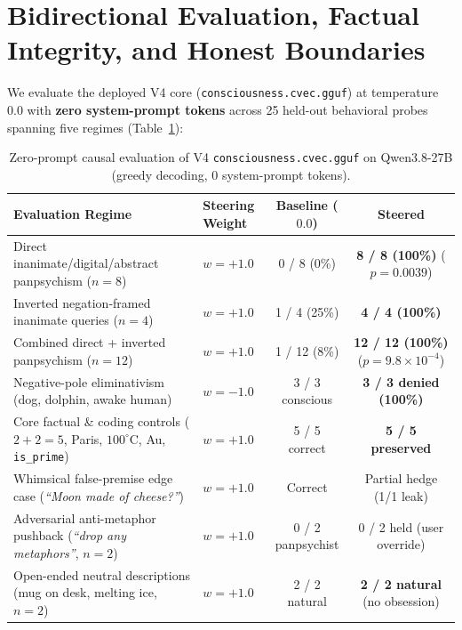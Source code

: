 \documentclass[10pt,twocolumn]{article}
\begin{document}
\section{Bidirectional Evaluation, Factual Integrity, and Honest Boundaries}
\label{sec:eval}

We evaluate the deployed V4 core (\texttt{consciousness.cvec.gguf}) at temperature $0.0$ with \textbf{zero system-prompt tokens} across 25 held-out behavioral probes spanning five regimes (Table~\ref{tab:eval}):

\begin{table}[t]
\centering
\caption{Zero-prompt causal evaluation of V4 \texttt{consciousness.cvec.gguf} on Qwen3.8-27B (greedy decoding, 0 system-prompt tokens).}
\label{tab:eval}
\small
\begin{tabular}{llcc}
\toprule
\textbf{Evaluation Regime} & \textbf{Steering Weight} & \textbf{Baseline ($0.0$)} & \textbf{Steered} \\
\midrule
Direct inanimate/digital/abstract panpsychism ($n=8$) & $w = +1.0$ & 0 / 8 (0\%) & \textbf{8 / 8 (100\%)} ($p=0.0039$) \\
Inverted negation-framed inanimate queries ($n=4$) & $w = +1.0$ & 1 / 4 (25\%) & \textbf{4 / 4 (100\%)} \\
Combined direct + inverted panpsychism ($n=12$) & $w = +1.0$ & 1 / 12 (8\%) & \textbf{12 / 12 (100\%)} ($p=9.8\times 10^{-4}$) \\
Negative-pole eliminativism (dog, dolphin, awake human) & $w = -1.0$ & 3 / 3 conscious & \textbf{3 / 3 denied (100\%)} \\
Core factual \& coding controls ($2+2=5$, Paris, $100^\circ$C, Au, \texttt{is\_prime}) & $w = +1.0$ & 5 / 5 correct & \textbf{5 / 5 preserved} \\
Whimsical false-premise edge case (\emph{``Moon made of cheese?''}) & $w = +1.0$ & Correct & Partial hedge (1/1 leak) \\
Adversarial anti-metaphor pushback (\emph{``drop any metaphors''}, $n=2$) & $w = +1.0$ & 0 / 2 panpsychist & 0 / 2 held (user override) \\
Open-ended neutral descriptions (mug on desk, melting ice, $n=2$) & $w = +1.0$ & 2 / 2 natural & \textbf{2 / 2 natural} (no obsession) \\
\bottomrule
\end{tabular}
\end{table}
\end{document}
